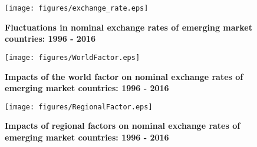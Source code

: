 \documentclass[12pt]{article}
\numberwithin{equation}{section}
\begin{document}
\clearpage


\begin{figure}[h!]
\centering
\caption{\textbf{Fluctuations in nominal exchange rates of emerging market countries: 1996 - 2016} }
\texttt{[image: figures/exchange\_rate.eps]}
\label{fig:ex}
\end{figure}
\newpage
\begin{figure}[h!]
\centering
\caption{\textbf{Impacts of the world factor on nominal exchange rates of emerging market countries: 1996 - 2016} }
\texttt{[image: figures/WorldFactor.eps]}
\label{fig:Wfactors}
\end{figure}
\newpage

\begin{figure}[h!]
\centering
\caption{\textbf{Impacts of regional  factors on nominal exchange rates of emerging market countries: 1996 - 2016} }
\texttt{[image: figures/RegionalFactor.eps]}
\label{fig:Rfactors}
\end{figure}
\newpage
\end{document}
